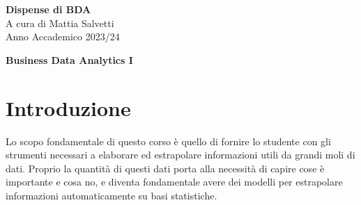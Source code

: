 \documentclass{article}
\begin{document}
    \begin{titlepage}
        \begin{center}
            \vspace{3cm}
            \Huge\textbf{Dispense di BDA}\\
            \vspace{1cm}
            \huge{A cura di Mattia Salvetti}\\
            \vspace{1cm}
            \large{Anno Accademico 2023/24}\\
            \vspace{5cm}
            \vspace{1cm}
            
        \end{center}
    \end{titlepage}
    \tableofcontents
    \newpage
    \begin{center}
        \Huge\textbf{Business Data Analytics I}
    \end{center}
    \section{Introduzione} 
    Lo scopo fondamentale di questo corso è quello di fornire lo studente con gli strumenti necessari a elaborare ed estrapolare informazioni utili da grandi moli di dati. Proprio la quantità di questi dati porta alla necessità di capire cose è importante e cosa no, e diventa fondamentale avere dei modelli per estrapolare informazioni automaticamente su basi statistiche. 
\end{document}
